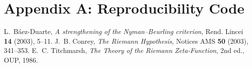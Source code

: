 \documentclass[11pt]{article}
\theoremstyle{remark}
\begin{document}
\appendix
\section{Appendix A: Reproducibility Code}


\begin{thebibliography}{9}
 L.~Báez-Duarte, \emph{A strengthening of the Nyman--Beurling criterion}, Rend. Lincei \textbf{14} (2003), 5--11.
 J.~B. Conrey, \emph{The Riemann Hypothesis}, Notices AMS \textbf{50} (2003), 341--353.
 E.~C. Titchmarsh, \emph{The Theory of the Riemann Zeta-Function}, 2nd ed., OUP, 1986.
\end{thebibliography}
\end{document}
